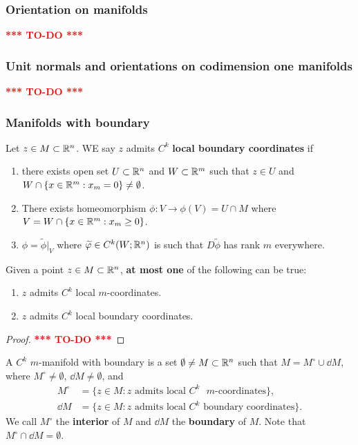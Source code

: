 \documentclass[a4paper]{article}
\newcommand{\TODO}{\textcolor{red}{\textbf{*** TO-DO ***}}}
\begin{document}
\subsubsection{Orientation on manifolds}

\TODO

\subsubsection{Unit normals and orientations on codimension
  one manifolds}

\TODO

\subsubsection{Manifolds with boundary}

\begin{defi}
  Let $z \in M \subset \mathbb{R}^n$. WE say $z$ admits $C^k$ \textbf{local
    boundary coordinates} if
  \begin{enumerate}
    \item there exists open set $U \subset \mathbb{R}^n$ and $W \subset \mathbb{R}^m$ such
          that $z \in U$ and $W \cap \{x \in \mathbb{R}^m : x_m = 0\} \neq
          \emptyset$.

    \item There exists homeomorphism $\phi: V \to \phi(V) = U \cap M$
          where $V = W \cap \{x \in \mathbb{R}^m: x_m \geq 0\}$.

    \item $\phi = \tilde{\phi} \vert_V$ where $\widetilde{\varphi} \in C^k
            (W; \mathbb{R}^n)$ is such that $D \tilde{\phi}$ has rank $m$ everywhere.
  \end{enumerate}
\end{defi}

\begin{prop}
  Given a point $z \in M \subset \mathbb{R}^n$, \textbf{at most one} of the
  following can be true:
  \begin{enumerate}
    \item $z$ admits $C^k$ local $m$-coordinates.
    \item $z$ admits $C^k$ local boundary coordinates.
  \end{enumerate}
\end{prop}

\begin{proof}
  \TODO
\end{proof}

\begin{defi}
  A $C^k$ $m$-manifold with boundary is a set $\emptyset \neq M \subset
    \mathbb{R}^n$ such that $M = M^\circ \cup \dd M$, where $M^\circ \neq
    \emptyset$, $\dd M \neq \emptyset$, and
  \[
    \begin{aligned}
    M^\circ &= \{z \in M : \text{$z$ admits local
  $C^k$ $m$-coordinates}\}, \\
    \dd M &= \{z \in M : \text{$z$ admits local $C^k$ boundary
    coordinates}\}.
    \end{aligned}
  \]
  We call $M^\circ$ the \textbf{interior} of $M$ and $\dd M$ the
  \textbf{boundary} of $M$. Note that $M^\circ \cap \dd M = \emptyset$.
\end{defi}
\end{document}
